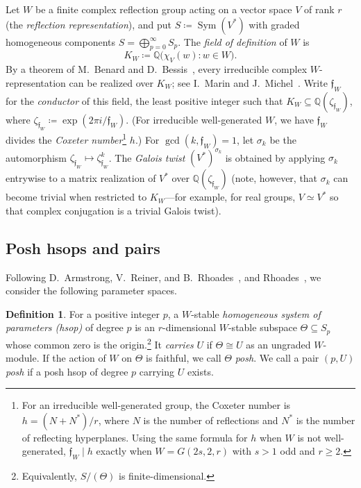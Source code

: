 \documentclass[10pt,a4paper]{amsart}
\newcommand{\defeq}{\coloneqq}
\newcommand{\defn}[1]{\emph{\color{darkblue}#1}}
\theoremstyle{definition}
\newtheorem{definition}[theorem]{Definition}
\DeclareMathOperator{\Sym}{Sym}\DeclareMathOperator{\Hom}{Hom}
\begin{document}
Let $W$ be a finite complex reflection group acting on a vector space
$V$ of rank $r$ (the \defn{reflection representation}), and put $S\defeq \Sym(V^*)$ with graded homogeneous components $S=\bigoplus_{p=0}^\infty S_p$.  The \defn{field of definition} of $W$ is
\[
 K_W\defeq \mathbb{Q}\bigl(\chi_V(w):w\in W\bigr).
\]
By a theorem of M.~Benard and D.~Bessis~\cite{Benard,BessisField}, every irreducible complex
$W$-representation can be realized over $K_W$; see I.~Marin and J.~Michel~\cite[Introduction]{MarinMichel}.
Write $\mathfrak f_W$ for the \defn{conductor} of this field, the least
positive integer such that $K_W\subseteq\mathbb{Q}(\zeta_{\mathfrak f_W})$,
where $\zeta_{\mathfrak f_W}\defeq\exp(2\pi i/\mathfrak f_W)$.  (For irreducible well-generated $W$, we have $\mathfrak f_W$ divides the \defn{Coxeter number}\footnote{For an irreducible well-generated group, the Coxeter number is $h=(N+N^*)/r$, where $N$ is the number of reflections and $N^*$ is the number of reflecting hyperplanes. Using the same formula for $h$ when $W$ is not well-generated, $\mathfrak f_W\mid h$ exactly when $W=G(2s,2,r)$ with $s>1$ odd and $r\geq2$.} $h$.)  For $\gcd(k,\mathfrak f_W)=1$, let $\sigma_k$ be the automorphism
$\zeta_{\mathfrak f_W}\mapsto\zeta_{\mathfrak f_W}^k$.
The \defn{Galois twist} $(V^*)^{\sigma_k}$ is obtained by applying
$\sigma_k$ entrywise to a matrix realization of $V^*$ over $\mathbb{Q}(\zeta_{\mathfrak f_W})$ (note, however, that $\sigma_k$ can become trivial when restricted to $K_W$---for example, for real groups, $V\simeq V^*$ so that complex conjugation is a trivial Galois twist).

\subsection{Posh hsops and pairs}

Following D.~Armstrong, V.~Reiner, and B.~Rhoades~\cite{ARR}, and
Rhoades~\cite{RhoadesFuss}, we consider the following parameter spaces.
\begin{definition}
For a positive integer $p$, a $W$-stable \defn{homogeneous system of
parameters (hsop)} of degree $p$ is an $r$-dimensional $W$-stable
subspace $\Theta\subseteq S_p$ whose common zero is the origin.\footnote{Equivalently, $S/(\Theta)$ is finite-dimensional.}
It \defn{carries} $U$ if $\Theta\cong U$ as an ungraded $W$-module.
If the action of $W$ on $\Theta$ is faithful, we call $\Theta$
\defn{posh}. We call a pair $(p,U)$ \defn{posh} if a
posh hsop of degree $p$ carrying $U$ exists.
\label{def:parking_hsop}
\label{def:posh}
\end{definition}
\end{document}

